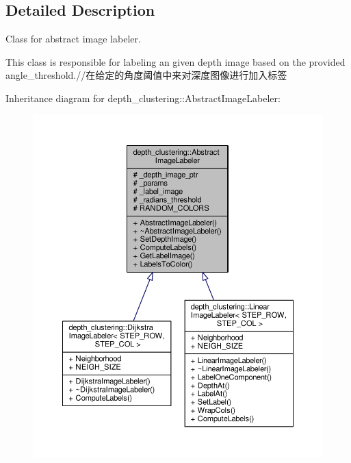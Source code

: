 \subsection{Detailed Description}
Class for abstract image labeler. 

This class is responsible for labeling an given depth image based on the provided angle\-\_\-threshold.//在给定的角度阈值中来对深度图像进行加入标签 

Inheritance diagram for depth\-\_\-clustering\-:\-:Abstract\-Image\-Labeler\-:
\nopagebreak
\begin{figure}[H]
\begin{center}
\leavevmode
\includegraphics[width=350pt]{classdepth__clustering_1_1AbstractImageLabeler__inherit__graph}
\end{center}
\end{figure}


